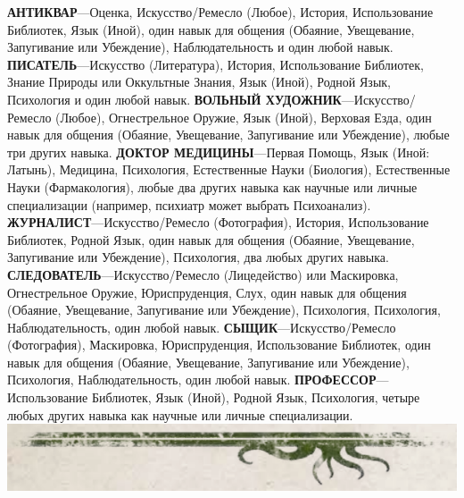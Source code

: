 \documentclass[letterpaper,twocolumn,openany, twoside, 11pt, usenames]{cocbook}
\begin{document}
\begin{cocpaperbox}{}{}
  \textbf{АНТИКВАР}---Оценка, Искусство/Ремесло (Любое), История, Использование Библиотек, Язык (Иной), один навык для общения (Обаяние, Увещевание, Запугивание или Убеждение), Наблюдательность и один любой навык.
  \bigbreak
  \textbf{ПИСАТЕЛЬ}---Искусство (Литература), История, Использование Библиотек, Знание Природы или Оккультные Знания, Язык (Иной), Родной Язык, Психология и один любой навык.
  \bigbreak
  \textbf{ВОЛЬНЫЙ ХУДОЖНИК}---Искусство/Ремесло (Любое), Огнестрельное Оружие,  Язык (Иной), Верховая Езда, один навык для общения (Обаяние, Увещевание, Запугивание или Убеждение), любые три других навыка.
  \bigbreak
  \textbf{ДОКТОР МЕДИЦИНЫ}---Первая Помощь, Язык (Иной: Латынь), Медицина, Психология, Естественные Науки (Биология), Естественные Науки (Фармакология), любые два других навыка как научные или личные специализации (например, психиатр может выбрать Психоанализ).
  \bigbreak
  \textbf{ЖУРНАЛИСТ}---Искусство/Ремесло (Фотография), История, Использование Библиотек, Родной Язык, один навык для общения (Обаяние, Увещевание, Запугивание или Убеждение), Психология, два любых других навыка.
  \bigbreak
  \textbf{СЛЕДОВАТЕЛЬ}---Искусство/Ремесло (Лицедейство) или Маскировка, Огнестрельное Оружие, Юриспруденция, Слух, один навык для общения (Обаяние, Увещевание, Запугивание или Убеждение), Психология, Психология, Наблюдательность, один любой навык.
  \bigbreak
  \textbf{СЫЩИК}---Искусство/Ремесло (Фотография), Маскировка, Юриспруденция, Использование Библиотек, один навык для общения (Обаяние, Увещевание, Запугивание или Убеждение), Психология, Наблюдательность, один любой навык.
  \bigbreak
  \textbf{ПРОФЕССОР}---Использование Библиотек, Язык (Иной), Родной Язык, Психология, четыре любых других навыка как научные или личные специализации.
  \includegraphics[width=\linewidth]{img/bottom.png}
\end{cocpaperbox}
\end{document}

